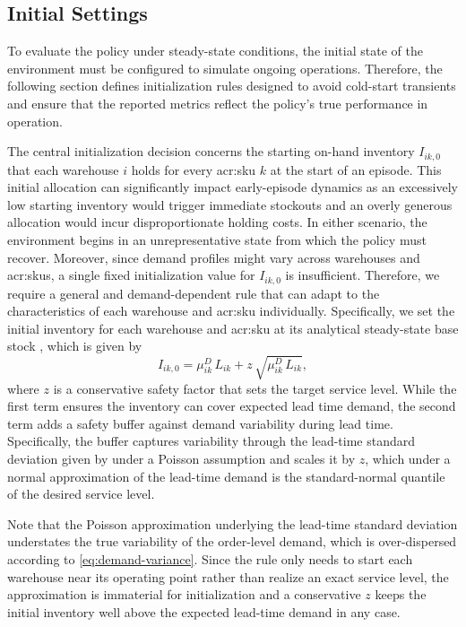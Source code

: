 \subsection{Initial Settings}
\label{subsec:initial-settings}
To evaluate the policy under steady-state conditions, the initial state of the environment must be configured to simulate ongoing operations. Therefore, the following section defines initialization rules designed to avoid cold-start transients and ensure that the reported metrics reflect the policy's true performance in operation.

The central initialization decision concerns the starting on-hand inventory $I_{ik,0}$ that each warehouse $i$ holds for every \gls{acr:sku} $k$ at the start of an episode. This initial allocation can significantly impact early-episode dynamics as an excessively low starting inventory would trigger immediate stockouts and an overly generous allocation would incur disproportionate holding costs. In either scenario, the environment begins in an unrepresentative state from which the policy must recover. Moreover, since demand profiles might vary across warehouses and \glspl{acr:sku}, a single fixed initialization value for  $I_{ik,0}$ is insufficient. Therefore, we require a general and demand-dependent rule that can adapt to the characteristics of each warehouse and \gls{acr:sku} individually. Specifically, we set the initial inventory for each warehouse and \gls{acr:sku} at its analytical steady-state base stock \citep{karlin1960sSoptimality}, which is given by
\begin{equation}
\label{eq:initial-inventory}
  I_{ik,0} = \mu^D_{ik}\,L_{ik} + z\,\sqrt{\mu^D_{ik}\,L_{ik}},
\end{equation}
where $z$ is a conservative safety factor that sets the target service level. While the first term ensures the inventory can cover expected lead time demand, the second term adds a safety buffer against demand variability during lead time. Specifically, the buffer captures variability through the lead-time standard deviation given by  under a Poisson assumption and scales it by $z$, which under a normal approximation of the lead-time demand is the standard-normal quantile of the desired service level. 

Note that the Poisson approximation underlying the lead-time standard deviation understates the true variability of the order-level demand, which is over-dispersed according to \autoref{eq:demand-variance}. Since the rule only needs to start each warehouse near its operating point rather than realize an exact service level, the approximation is immaterial for initialization and a conservative $z$ keeps the initial inventory well above the expected lead-time demand in any case.

